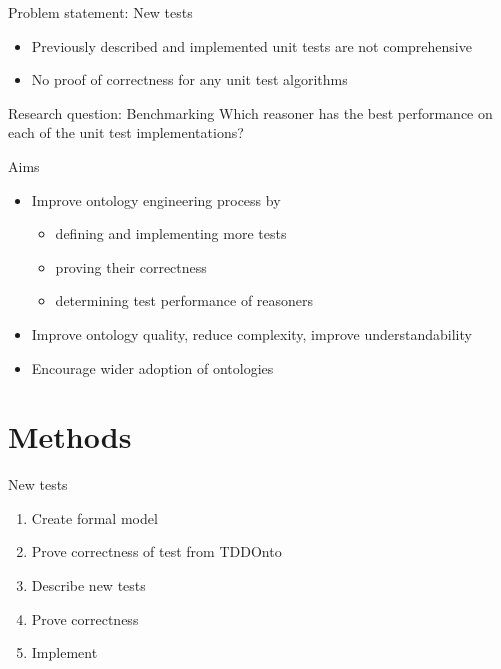 \documentclass[17pt,mathserif]{beamer}
\begin{document}
\begin{frame}{Problem statement: New tests}
  \begin{itemize}
    \item Previously described and implemented unit tests are not comprehensive
    \item No proof of correctness for any unit test algorithms
  \end{itemize}
\end{frame}

\begin{frame}{Research question: Benchmarking}
  \centering
  Which reasoner has the best performance on each of the unit test implementations?
\end{frame}

\begin{frame}{Aims}
  \begin{itemize}
    \item Improve ontology engineering process by
    \begin{itemize}
      \item defining and implementing more tests
      \item proving their correctness
      \item determining test performance of reasoners
    \end{itemize}
    \item Improve ontology quality, reduce complexity, improve understandability
    \item Encourage wider adoption of ontologies
  \end{itemize}
\end{frame}

\section{Methods}

\begin{frame}{New tests}
  \begin{enumerate}
    \item Create formal model
    \item Prove correctness of test from TDDOnto
    \item Describe new tests
    \item Prove correctness
    \item Implement
  \end{enumerate}
\end{frame}
\end{document}
